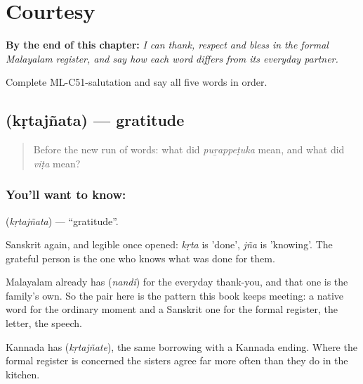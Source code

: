 
\chapter{Courtesy}
\label{ch:ml-courtesy}

\begin{chapteropening}
\textbf{By the end of this chapter:} \emph{I can thank, respect and bless in the formal Malayalam register, and say how each word differs from its everyday partner.}

Complete ML-C51-salutation and say all five words in order.
\end{chapteropening}

\section[\texorpdfstring{\ml{കൃതജ്ഞത} (kṛtajñata)}{കൃതജ്ഞത (kṛtajñata)}]{ (kṛtajñata) — gratitude}

\label{lesson:ML-C51-gratitude}



\begin{quote}
Before the new run of words: what did \emph{puṟappeṭuka} mean, and what did \emph{viṭa} mean?
\end{quote}

\subsection*{You'll want to know: }
\textbf{} (\emph{kṛtajñata}) — \textquotedblleft{}gratitude\textquotedblright{}.

Sanskrit again, and legible once opened: \emph{kṛta} is 'done', \emph{jña} is 'knowing'. The grateful person is the one who knows what was done for them.

Malayalam already has  (\emph{nandi}) for the everyday thank-you, and that one is the family's own. So the pair here is the pattern this book keeps meeting: a native word for the ordinary moment and a Sanskrit one for the formal register, the letter, the speech.

Kannada has  (\emph{kṛtajñate}), the same borrowing with a Kannada ending. Where the formal register is concerned the sisters agree far more often than they do in the kitchen.


